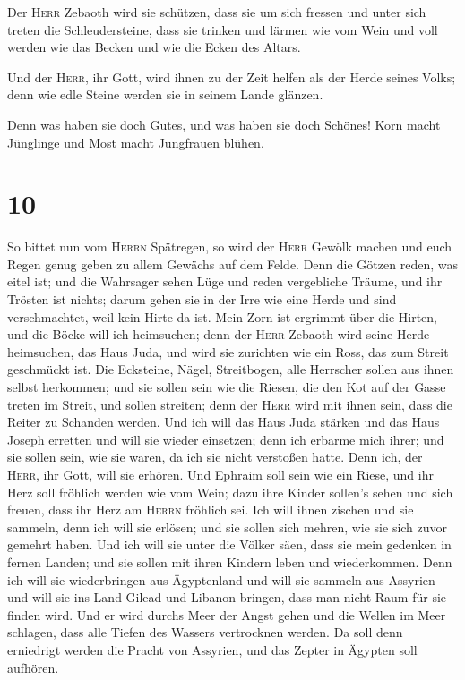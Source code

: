  Der \textsc{Herr} Zebaoth wird sie schützen, dass sie um
sich fressen und unter sich treten die Schleudersteine, dass sie trinken
und lärmen wie vom Wein und voll werden wie das Becken und wie die Ecken
des Altars.

 Und der \textsc{Herr}, ihr Gott, wird ihnen zu der Zeit
helfen als der Herde seines Volks; denn wie edle Steine werden sie in
seinem Lande glänzen.

 Denn was haben sie doch Gutes, und was haben sie doch
Schönes! Korn macht Jünglinge und Most macht Jungfrauen blühen.

\hypertarget{section-9}{%
\section{10}\label{section-9}}

 So bittet nun vom \textsc{Herrn} Spätregen, so wird der
\textsc{Herr} Gewölk machen und euch Regen genug geben zu allem Gewächs
auf dem Felde.  Denn die Götzen reden, was eitel ist; und
die Wahrsager sehen Lüge und reden vergebliche Träume, und ihr Trösten
ist nichts; darum gehen sie in der Irre wie eine Herde und sind
verschmachtet, weil kein Hirte da ist.  Mein Zorn ist
ergrimmt über die Hirten, und die Böcke will ich heimsuchen; denn der
\textsc{Herr} Zebaoth wird seine Herde heimsuchen, das Haus Juda, und
wird sie zurichten wie ein Ross, das zum Streit geschmückt ist.
 Die Ecksteine, Nägel, Streitbogen, alle Herrscher sollen
aus ihnen selbst herkommen;  und sie sollen sein wie die
Riesen, die den Kot auf der Gasse treten im Streit, und sollen streiten;
denn der \textsc{Herr} wird mit ihnen sein, dass die Reiter zu Schanden
werden.  Und ich will das Haus Juda stärken und das Haus
Joseph erretten und will sie wieder einsetzen; denn ich erbarme mich
ihrer; und sie sollen sein, wie sie waren, da ich sie nicht verstoßen
hatte. Denn ich, der \textsc{Herr}, ihr Gott, will sie erhören.
 Und Ephraim soll sein wie ein Riese, und ihr Herz soll
fröhlich werden wie vom Wein; dazu ihre Kinder sollen's sehen und sich
freuen, dass ihr Herz am \textsc{Herrn} fröhlich sei.  Ich
will ihnen zischen und sie sammeln, denn ich will sie erlösen; und sie
sollen sich mehren, wie sie sich zuvor gemehrt haben.  Und
ich will sie unter die Völker säen, dass sie mein gedenken in fernen
Landen; und sie sollen mit ihren Kindern leben und wiederkommen.
 Denn ich will sie wiederbringen aus Ägyptenland und will
sie sammeln aus Assyrien und will sie ins Land Gilead und Libanon
bringen, dass man nicht Raum für sie finden wird.  Und er
wird durchs Meer der Angst gehen und die Wellen im Meer schlagen, dass
alle Tiefen des Wassers vertrocknen werden. Da soll denn erniedrigt
werden die Pracht von Assyrien, und das Zepter in Ägypten soll aufhören.

